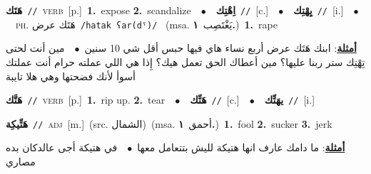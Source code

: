 \documentclass[10pt,a4paper,twoside]{article} %
\begin{document}
\begin{multicols}{2}
{\setlength\topsep{0pt}\textbf{\foreignlanguage{arabic}{هَتَك}}\ {\color{gray}\texttt{//}\color{black}}\ \textsc{verb}\ [p.]\ \textbf{1.}~expose  \textbf{2.}~scandalize\ \ $\bullet$\ \ \setlength\topsep{0pt}\textbf{\foreignlanguage{arabic}{اِهْتِك}}\ {\color{gray}\texttt{//}\color{black}}\ [c.]\ \ $\bullet$\ \ \setlength\topsep{0pt}\textbf{\foreignlanguage{arabic}{يِهْتِك}}\ {\color{gray}\texttt{//}\color{black}}\ [i.]\ \ $\bullet$\ \ \textsc{ph.} \color{gray} \foreignlanguage{arabic}{هَتَك عرض}\color{black}\ {\color{gray}\texttt{/{\sffamily hatak ʕar(dˤ)}/}\color{black}}\ \color{gray} (msa. \foreignlanguage{arabic}{يَغْتَصِب}~\foreignlanguage{arabic}{\textbf{١.}})\color{black}\ \textbf{1.}~rape\  \begin{flushright}\color{gray}\foreignlanguage{arabic}{\textbf{\underline{\foreignlanguage{arabic}{أمثلة}}}: ابنك هَتَك عرض أربع نساء هاي فيها حبس أقل شي 10 سنين\ $\bullet$\ \  مين أنت لحتى تِهْتِك ستر ربنا عليها؟ مين أعطاك الحق تعمل هيك؟ إِذا هي اللي عملته حرام أنت عملتك أسوأ لأنك فضحتها وهي هلا تايبة}\end{flushright}\color{black}} \vspace{2mm}

{\setlength\topsep{0pt}\textbf{\foreignlanguage{arabic}{هَتَّك}}\ {\color{gray}\texttt{//}\color{black}}\ \textsc{verb}\ [p.]\ \textbf{1.}~rip up.  \textbf{2.}~tear\ \ $\bullet$\ \ \setlength\topsep{0pt}\textbf{\foreignlanguage{arabic}{هَتِّك}}\ {\color{gray}\texttt{//}\color{black}}\ [c.]\ \ $\bullet$\ \ \setlength\topsep{0pt}\textbf{\foreignlanguage{arabic}{يهَتِّك}}\ {\color{gray}\texttt{//}\color{black}}\ [i.]\ } \vspace{2mm}

{\setlength\topsep{0pt}\textbf{\foreignlanguage{arabic}{هَتِّيكِة}}\ {\color{gray}\texttt{//}\color{black}}\ \textsc{adj}\ [m.]\ (src. \color{gray}\foreignlanguage{arabic}{الشمال}\color{black})\ \color{gray}(msa. \foreignlanguage{arabic}{أحمق}~\foreignlanguage{arabic}{\textbf{١.}})\color{black}\ \textbf{1.}~fool  \textbf{2.}~sucker  \textbf{3.}~jerk\  \begin{flushright}\color{gray}\foreignlanguage{arabic}{\textbf{\underline{\foreignlanguage{arabic}{أمثلة}}}: ما دامك عارف انها هتيكة لليش بتتعامل معها\ $\bullet$\ \  في هتيكة أجى عالدكان بده مصاري}\end{flushright}\color{black}} \vspace{2mm}


\end{multicols}
\end{document}
